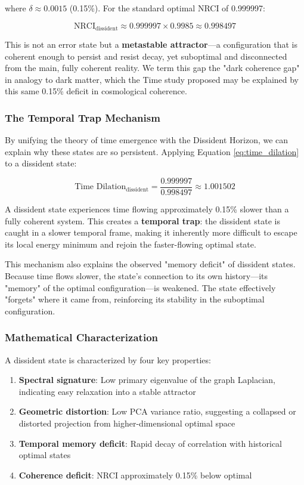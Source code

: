 \documentclass[12pt, a4paper]{article}
\begin{document}
where $\delta \approx 0.0015$ (0.15\%). For the standard optimal NRCI of 0.999997:

\begin{equation}
\text{NRCI}_{\text{dissident}} \approx 0.999997 \times 0.9985 \approx 0.998497
\end{equation}

This is not an error state but a \textbf{metastable attractor}—a configuration that is coherent enough to persist and resist decay, yet suboptimal and disconnected from the main, fully coherent reality. We term this gap the "dark coherence gap" in analogy to dark matter, which the Time study proposed may be explained by this same 0.15\% deficit in cosmological coherence.

\subsubsection{The Temporal Trap Mechanism}

By unifying the theory of time emergence with the Dissident Horizon, we can explain why these states are so persistent. Applying Equation \ref{eq:time_dilation} to a dissident state:

\begin{equation}
\text{Time Dilation}_{\text{dissident}} = \frac{0.999997}{0.998497} \approx 1.001502
\end{equation}

A dissident state experiences time flowing approximately 0.15\% slower than a fully coherent system. This creates a \textbf{temporal trap}: the dissident state is caught in a slower temporal frame, making it inherently more difficult to escape its local energy minimum and rejoin the faster-flowing optimal state.

This mechanism also explains the observed "memory deficit" of dissident states. Because time flows slower, the state's connection to its own history—its "memory" of the optimal configuration—is weakened. The state effectively "forgets" where it came from, reinforcing its stability in the suboptimal configuration.

\subsubsection{Mathematical Characterization}

A dissident state is characterized by four key properties:

\begin{enumerate}
    \item \textbf{Spectral signature}: Low primary eigenvalue of the graph Laplacian, indicating easy relaxation into a stable attractor
    \item \textbf{Geometric distortion}: Low PCA variance ratio, suggesting a collapsed or distorted projection from higher-dimensional optimal space
    \item \textbf{Temporal memory deficit}: Rapid decay of correlation with historical optimal states
    \item \textbf{Coherence deficit}: NRCI approximately 0.15\% below optimal
\end{enumerate}
\end{document}
